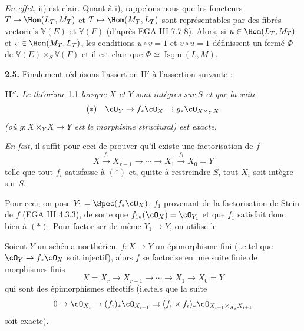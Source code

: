 \noindent\textit{En effet,} ii) est clair. Quant à i), rappelons-nous que les foncteurs $T \mapsto \Hom(L_T, M_T)$ et $T \mapsto \Hom(M_T, L_T)$ sont représentables par des fibrés vectoriels $\mathbb{V}(E)$ et $\mathbb{V}(F)$ (d'après EGA III 7.7.8). Alors, si $u \in \Hom(L_T, M_T)$ et $v \in \Hom(M_T, L_T)$, les conditions $u \circ v = 1$ et $v \circ u = 1$ définissent un fermé $\Phi$ de $\mathbb{V}(E) \times_S \mathbb{V}(F)$ et il est clair que $\Phi \simeq \underline{\operatorname{Isom}}(L,M)$.

\smallskip
\noindent\textbf{2.5.} Finalement réduisons l'assertion II$'$ à l'assertion suivante :

\smallskip
\noindent\textbf{II$''$.} \textit{Le théorème} 1.1 \textit{lorsque} $X$ \textit{et} $Y$ \textit{sont intègres sur} $S$ \textit{et que la suite}
\[
(*) \quad \cO_Y \to f_* \cO_X \rightrightarrows g_* \cO_{X \times_Y X}
\]
\textit{(où $g : X \times_Y X \to Y$ est le morphisme structural) est exacte.}

\smallskip
\noindent\textit{En fait,} il suffit pour ceci de prouver qu'il existe une factorisation de $f$
\[
X \xrightarrow{f_r} X_{r-1} \to \cdots \to X_1 \xrightarrow{f_1} X_0 = Y
\]
telle que tout $f_i$ satisfasse à $(*)$ et, quitte à restreindre $S$, tout $X_i$ soit intègre sur $S$.

Pour ceci, on pose $Y_1 = \Spec(f_* \cO_X)$, $f_1$ provenant de la factorisation de Stein de $f$ (EGA III 4.3.3), de sorte que $f_{1*}(\cO_X) = \cO_{Y_1}$ et que $f_1$ satisfait donc bien à $(*)$. Pour factoriser de même $Y_1 \to Y$, on utilise le

\begin{lem}\label{lem:2.6} Soient $Y$ un schéma noethérien, $f : X \to Y$ un épimorphisme fini \textup{(}i.e.\@ tel que $\cO_Y \to f_* \cO_X$ soit injectif\textup{)}, alors $f$ se factorise en une suite finie de morphismes finis
\[
X = X_r \to X_{r-1} \to \cdots \to X_1 \to X_0 = Y
\]
qui sont des épimorphismes effectifs \textup{(}i.e.\@ tels que la suite
\[
0 \to \cO_{X_i} \to (f_i)_* \cO_{X_{i+1}} \rightrightarrows (f_i \times f_i)_* \cO_{X_{i+1} \times_{X_i} X_{i+1}}
\]
soit exacte\textup{)}.
\end{lem}

